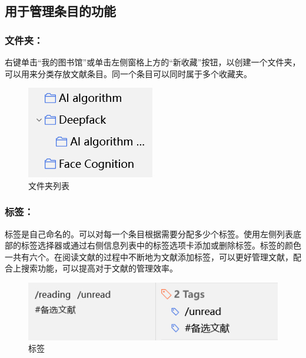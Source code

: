 \documentclass[]{ctexbook}
\theoremstyle{definition}
\theoremstyle{definition}
\theoremstyle{definition}
\theoremstyle{definition}
\theoremstyle{remark}
\begin{document}
\subsection{用于管理条目的功能}\label{ux7528ux4e8eux7ba1ux7406ux6761ux76eeux7684ux529fux80fd}

\subsubsection{文件夹：}\label{ux6587ux4ef6ux5939}

右键单击``我的图书馆''或单击左侧窗格上方的``新收藏''按钮，以创建一个文件夹，可以用来分类存放文献条目。同一个条目可以同时属于多个收藏夹。

\begin{figure}

{\centering \includegraphics[width=0.4\linewidth]{img/zotero/zotero_list} 

}

\caption{文件夹列表}\label{fig:zotero-list}
\end{figure}

\subsubsection{标签：}\label{ux6807ux7b7e}

标签是自己命名的。可以对每一个条目根据需要分配多少个标签。使用左侧列表底部的标签选择器或通过右侧信息列表中的标签选项卡添加或删除标签。标签的颜色一共有六个。在阅读文献的过程中不断地为文献添加标签，可以更好管理文献，配合上搜索功能，可以提高对于文献的管理效率。

\begin{figure}

{\centering \includegraphics[width=0.9\linewidth]{img/zotero/zotero_tag} 

}

\caption{标签}\label{fig:zotero-tag}
\end{figure}
\end{document}
